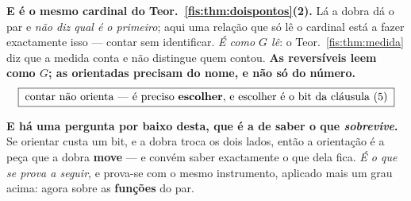 \documentclass[livro.tex]{subfiles}
\begin{document}
\medskip\noindent\textbf{E é o mesmo cardinal do Teor.~\ref{fis:thm:doispontos}(2).}
Lá a dobra dá o par e \emph{não diz qual é o primeiro}; aqui uma relação que só lê
o cardinal está a fazer exactamente isso --- contar sem identificar. \emph{É como
$G$ lê}: o Teor.~\ref{fis:thm:medida} diz que a medida conta e não distingue quem
contou. \textbf{As reversíveis leem como $G$; as orientadas precisam do nome, e
não só do número.}
\[
\boxed{\;\text{contar não orienta --- é preciso \textbf{escolher}, e escolher é o bit da cláusula~(5)}\;}
\]

\medskip\noindent\textbf{E há uma pergunta por baixo desta, que é a de saber o
que \emph{sobrevive}.} Se orientar custa um bit, e a dobra troca os dois lados,
então a orientação é a peça que a dobra \textbf{move} --- e convém saber
exactamente o que dela fica. \emph{É o que se prova a seguir}, e prova-se com o
mesmo instrumento, aplicado mais um grau acima: agora sobre as \textbf{funções}
do par.
\end{document}
